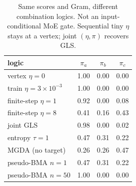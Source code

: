 \begin{table}[t]\centering
\caption{Same scores and Gram, different combination logics. Not an input-conditional MoE gate. Sequential tiny $\eta$ stays at a vertex; joint $(\eta,\pi)$ recovers GLS.}
\label{tab:agod-stack-logics}
\begin{tabular}{lccc}\toprule
logic & $\pi_a$ & $\pi_b$ & $\pi_c$ \\
\midrule
vertex $\eta=0$ & 1.00 & 0.00 & 0.00 \\
train $\eta=3\times10^{-3}$ & 1.00 & 0.00 & 0.00 \\
finite-step $\eta=1$ & 0.92 & 0.00 & 0.08 \\
finite-step $\eta=8$ & 0.41 & 0.16 & 0.43 \\
joint GLS & 0.98 & 0.00 & 0.02 \\
entropy $\tau=1$ & 0.47 & 0.31 & 0.22 \\
MGDA (no target) & 0.26 & 0.26 & 0.47 \\
pseudo-BMA $n=1$ & 0.47 & 0.31 & 0.22 \\
pseudo-BMA $n=50$ & 1.00 & 0.00 & 0.00 \\
\bottomrule
\end{tabular}
\end{table}
